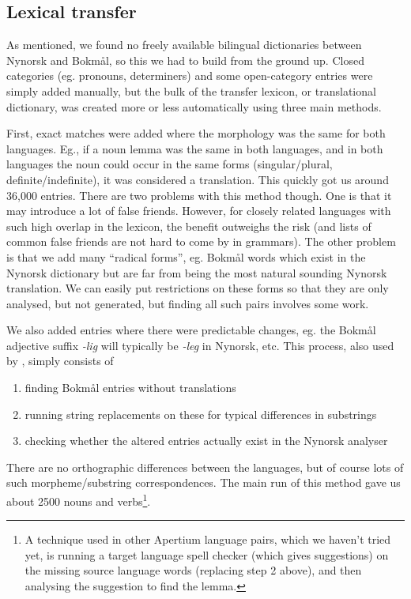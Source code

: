 \documentclass[11pt]{article}
\begin{document}
\subsection{Lexical transfer}

As mentioned, we found no freely available bilingual dictionaries
between Nynorsk and Bokmål, so this we had to build from the ground
up. Closed categories (eg. pronouns, determiners) and some
open-category entries were simply added manually, but the bulk of the
transfer lexicon, or translational dictionary, was created more or
less automatically using three main methods.

First, exact matches were added where the morphology was the same for
both languages. Eg., if a noun lemma was the same in both languages,
and in both languages the noun could occur in the same forms
(singular/plural, definite/indefinite), it was considered a
translation. This quickly got us around 36,000 entries. There are two
problems with this method though. One is that it may introduce a lot
of false friends. However, for closely related languages with such
high overlap in the lexicon, the benefit outweighs the risk (and lists
of common false friends are not hard to come by in grammars). The
other problem is that we add many ``radical forms'', eg. Bokmål words
which exist in the Nynorsk dictionary but are far from being the most
natural sounding Nynorsk translation. We can easily put restrictions
on these forms so that they are only analysed, but not generated, but
finding all such pairs involves some work.

We also added entries where there were predictable changes, eg. the
Bokmål adjective suffix \emph{-lig} will typically be \emph{-leg} in Nynorsk,
etc. This process, also used by \citet[p.~4]{tyers2009dpm},
simply consists of
\begin{enumerate}
\item finding Bokmål entries without translations \item running string replacements on these for typical differences in
   substrings
\item checking whether the altered entries actually exist in the Nynorsk
   analyser
\end{enumerate}
There are no orthographic differences between the languages, but of
course lots of such morpheme/substring correspondences. The main run
of this method gave us about 2500 nouns and verbs\footnote{A technique
  used in other Apertium language pairs, which we haven't tried yet,
  is running a target language spell checker (which gives suggestions)
  on the missing source language words (replacing step 2 above), and
  then analysing the suggestion to find the lemma. }.
\end{document}
